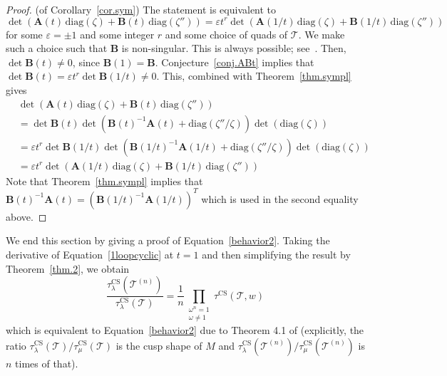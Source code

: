\documentclass[12pt,reqno]{amsart}
\theoremstyle{definition}
\def\calT{\mathcal T}
\def\ve{\varepsilon}
\def\be{\begin{equation}}
\def\ee{\end{equation}}
\def\CS{\mathrm{CS}}
\begin{document}
\begin{proof}(of Corollary~\ref{cor.sym})
The statement is equivalent to  
\be
\label{eqn.symm}
\det\left( \mathbf{A}(t)\, \mathrm{diag}(\zeta) + \mathbf{B}(t)\, \mathrm{diag}(\zeta'')
\right)= \ve t^r
\det\left( \mathbf{A}(1/t)\, \mathrm{diag}(\zeta) + \mathbf{B}(1/t)\,
\mathrm{diag}(\zeta'') \right) 
\ee
for some $\ve = \pm1$ and some integer $r$ and some choice of quads of $\calT$.
We make such a choice such that $\mathbf{B}$ is non-singular. This is always possible;
see~\cite[App.A]{DG1}. Then, $\det \mathbf{B}(t) \neq 0$, since
$\mathbf{B}(1)=\mathbf{B}$. Conjecture~\ref{conj.ABt} implies that
$\det \mathbf{B}(t)=\ve t^r \det \mathbf{B}(1/t) \neq 0$.
This, combined with Theorem~\ref{thm.sympl} gives
\begin{align*}
&\det\left( \mathbf{A}(t) \,\mathrm{diag}(\zeta)
+ \mathbf{B}(t)\, \mathrm{diag}(\zeta'') \right)\\
&= \det \mathbf{B}(t) \det \left(\mathbf{B}(t)^{-1} \mathbf{A}(t)
+ \mathrm{diag}(\zeta''/\zeta)\right) \det(\mathrm{diag}(\zeta))
\\
& =\ve t^r\det \mathbf{B}(1/t) \det \left(\mathbf{B}(1/t)^{-1} \mathbf{A}(1/t)
+ \mathrm{diag}(\zeta''/\zeta)\right) \det(\mathrm{diag}(\zeta))
\\
&=\ve t^r\det\left( \mathbf{A}(1/t)\, \mathrm{diag}(\zeta) + \mathbf{B}(1/t)\,
\mathrm{diag}(\zeta'') \right)
\end{align*}
Note that Theorem~\ref{thm.sympl} implies that
$\mathbf{B}(t)^{-1} \mathbf{A}(t)= (\mathbf{B}(1/t)^{-1} 
\mathbf{A}(1/t))^T$ which is used in the second equality above. 
\end{proof}

We end this section by giving a proof of Equation~\eqref{behavior2}. Taking the
derivative of Equation~\eqref{1loopcyclic} at $t=1$ and then simplifying
the result by Theorem~\ref{thm.2}, we obtain
\be
\label{behavior1}
\frac{\tau^\CS_\lambda(\calT^{(n)})}{\tau^\CS_\lambda(\calT)}
= \frac{1}{n}  \prod_{ \substack{\omega^n=1 \\ \omega \neq 1}} \tau^\CS(\calT,w)
\ee
which is equivalent to Equation~\eqref{behavior2} 
due to Theorem 4.1 of \cite{Porti:torsion} (explicitly, the ratio
$\tau_\lambda^{\CS}(\calT)/\tau_\mu^{\CS}(\calT)$ is the cusp shape of $M$ and
$\tau_\lambda^{\CS}(\calT^{(n)})/\tau_\mu^{\CS}(\calT^{(n)})$ is $n$ times of that).
\end{document}
